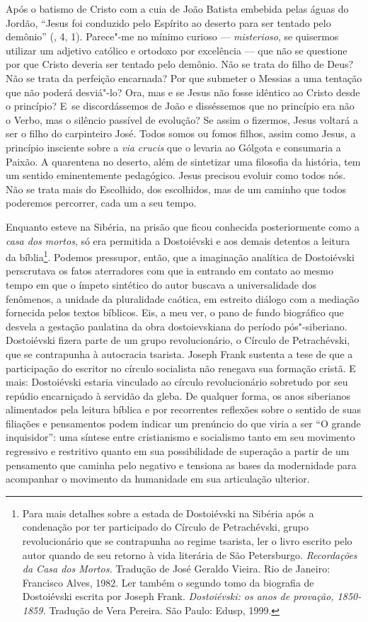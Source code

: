 Após o batismo de Cristo com a cuia de João Batista embebida pelas águas
do Jordão, ``Jesus foi conduzido pelo Espírito ao deserto para ser
tentado pelo demônio'' (, 4, 1). Parece"-me no mínimo curioso ---
\emph{misterioso}, se quisermos utilizar um adjetivo católico e ortodoxo
por excelência --- que não se questione por que Cristo deveria ser
tentado pelo demônio. Não se trata do filho de Deus? Não se trata da
perfeição encarnada? Por que submeter o Messias a uma tentação que não
poderá desviá"-lo? Ora, mas e se Jesus não fosse idêntico ao Cristo desde
o princípio? E~se discordássemos de João e disséssemos que no princípio
era não o Verbo, mas o silêncio passível de evolução? Se assim o
fizermos, Jesus voltará a ser o filho do carpinteiro José. Todos somos
ou fomos filhos, assim como Jesus, a princípio insciente sobre a
\emph{via crucis} que o levaria ao Gólgota e consumaria a Paixão. A
quarentena no deserto, além de sintetizar uma filosofia da história, tem
um sentido eminentemente pedagógico. Jesus precisou evoluir como todos
nós. Não se trata mais do Escolhido, dos escolhidos, mas de um caminho
que todos poderemos percorrer, cada um a seu tempo.

Enquanto esteve na Sibéria, na prisão que ficou conhecida posteriormente
como a \emph{casa dos mortos}, só era permitida a Dostoiévski e aos
demais detentos a leitura da bíblia\footnote{Para mais detalhes sobre a
  estada de Dostoiévski na Sibéria após a condenação por ter participado
  do Círculo de Petrachévski, grupo revolucionário que se contrapunha ao
  regime tsarista, ler o livro escrito pelo autor quando de seu retorno
  à vida literária de São Petersburgo. \emph{Recordações da Casa dos
  Mortos.} Tradução de José Geraldo Vieira. Rio de Janeiro: Francisco
  Alves, 1982. Ler também o segundo tomo da biografia de Dostoiévski
  escrita por Joseph Frank. \emph{Dostoiévski: os anos de provação,
  1850-1859.} Tradução de Vera Pereira. São Paulo: Edusp, 1999.}.
Podemos pressupor, então, que a imaginação analítica de Dostoiévski
perscrutava os fatos aterradores com que ia entrando em contato ao mesmo
tempo em que o ímpeto sintético do autor buscava a universalidade dos
fenômenos, a unidade da pluralidade caótica, em estreito diálogo com a
mediação fornecida pelos textos bíblicos. Eis, a meu ver, o pano de
fundo biográfico que desvela a gestação paulatina da obra dostoievskiana
do período pós"-siberiano. Dostoiévski fizera parte de um grupo
revolucionário, o Círculo de Petrachévski, que se contrapunha à
autocracia tsarista. Joseph Frank sustenta a tese de que a participação
do escritor no círculo socialista não renegava sua formação cristã. E
mais: Dostoiévski estaria vinculado ao círculo revolucionário sobretudo
por seu repúdio encarniçado à servidão da gleba. De qualquer forma, os
anos siberianos alimentados pela leitura bíblica e por recorrentes
reflexões sobre o sentido de suas filiações e pensamentos podem indicar
um prenúncio do que viria a ser ``O grande inquisidor'': uma síntese
entre cristianismo e socialismo tanto em seu movimento regressivo e
restritivo quanto em sua possibilidade de superação a partir de um
pensamento que caminha pelo negativo e tensiona as bases da modernidade
para acompanhar o movimento da humanidade em sua articulação ulterior.

